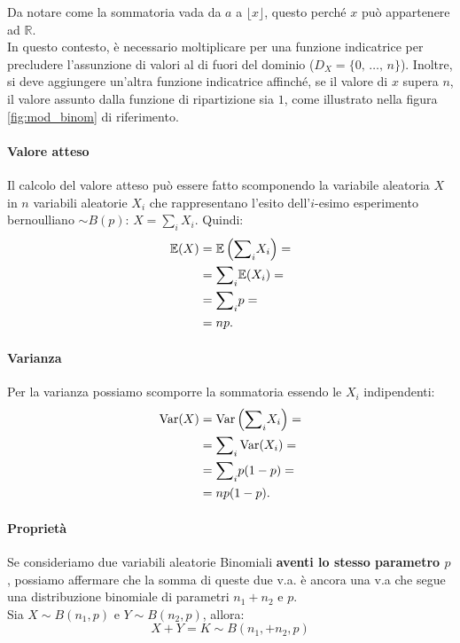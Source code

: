 \noindent Da notare come la sommatoria vada da $a$ a $\lfloor x \rfloor$, questo perché $x$ può appartenere ad $\mathbb{R}$.\\
In questo contesto, è necessario moltiplicare per una funzione indicatrice per precludere l'assunzione di valori al di fuori del dominio ($D_X = \{ 0, \, \dots, \, n \}$). Inoltre, si deve aggiungere un'altra funzione indicatrice affinché, se il valore di $x$ supera $n$, il valore assunto dalla funzione di ripartizione sia $1$, come illustrato nella figura \ref{fig:mod_binom} di riferimento.

\paragraph{Valore atteso} Il calcolo del {valore atteso} può essere fatto scomponendo la variabile aleatoria $X$ in $n$ variabili aleatorie $X_i$ che rappresentano l'esito dell'$i$-esimo esperimento bernoulliano $\sim B{(p)}$: $X = \sum_i X_i$. Quindi:
\begin{align*}
\mathbb{E}(X) &= \mathbb{E}\left({\sum}_i X_i\right) =\\
&= {\sum}_i \mathbb{E}(X_i) = \\ 
&= {\sum}_i p = \\ 
&= n p.
\end{align*}

\paragraph{Varianza} Per la {varianza} possiamo scomporre la sommatoria essendo le $X_i$ indipendenti:
\begin{align*}
\operatorname{Var}(X) &= \operatorname{Var}\left({\sum}_i X_i\right) = \\ 
&= {\sum}_i \operatorname{Var}(X_i) = \\
&= {\sum}_i p(1-p) = \\
&= n p(1-p).
\end{align*}

\paragraph{Proprietà}
Se consideriamo due variabili aleatorie Binomiali \textbf{aventi lo stesso parametro $p$}, possiamo affermare che la somma di queste due v.a. è ancora una v.a che segue una distribuzione binomiale di parametri $n_1 + n_2$ e $p$. \\

\noindent Sia $X \sim B(n_1, p)$ e $Y \sim B(n_2, p)$, allora:
$$X + Y = K \sim B(n_1, + n_2,  p)$$

